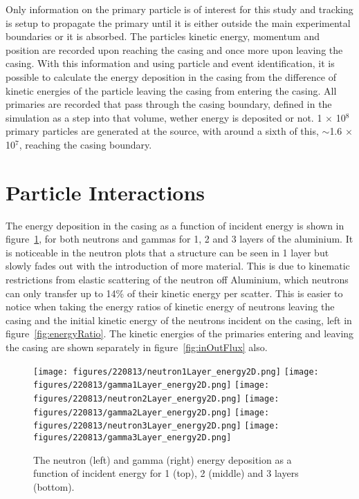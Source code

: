 \documentclass{article}
\begin{document}
Only information on the primary particle is of interest for this study and tracking is setup to propagate the primary until it is either outside the main experimental boundaries or it is absorbed. The particles kinetic energy, momentum and position are recorded upon reaching the casing and once more upon leaving the casing. With this information and using particle and event identification, it is possible to calculate the energy deposition in the casing from the difference of kinetic energies of the particle leaving the casing from entering the casing. All primaries are recorded that pass through the casing boundary, defined in the simulation as a step into that volume, wether energy is deposited or not. 1 $\times$ 10$^{8}$ primary particles are generated at the source, with around a sixth of this, $\sim$1.6 $\times$ 10$^{7}$, reaching the casing boundary. 


\section{Particle Interactions}
The energy deposition in the casing as a function of incident energy is shown in figure~\ref{fig:energyDep}, for both neutrons and gammas for 1, 2 and 3 layers of the aluminium. It is noticeable in the neutron plots that a structure can be seen in 1 layer but slowly fades out with the introduction of more material. This is due to kinematic restrictions from elastic scattering of the neutron off Aluminium, which neutrons can only transfer up to 14\% of their kinetic energy per scatter. This is easier to notice when taking the energy ratios of kinetic energy of neutrons leaving the casing and the initial kinetic energy of the neutrons incident on the casing, left in figure~\ref{fig:energyRatio}. The kinetic energies of the primaries entering and leaving the casing are shown separately in figure~\ref{fig:inOutFlux} also.

\begin{figure}[htbp]
\begin{center}
\texttt{[image: figures/220813/neutron1Layer\_energy2D.png]}
\texttt{[image: figures/220813/gamma1Layer\_energy2D.png]}
\texttt{[image: figures/220813/neutron2Layer\_energy2D.png]}
\texttt{[image: figures/220813/gamma2Layer\_energy2D.png]}
\texttt{[image: figures/220813/neutron3Layer\_energy2D.png]}
\texttt{[image: figures/220813/gamma3Layer\_energy2D.png]}
\caption{The neutron (left) and gamma (right) energy deposition as a function of incident energy for 1 (top), 2 (middle) and 3 layers (bottom).}
\label{fig:energyDep}
\end{center}
\end{figure}
\end{document}
